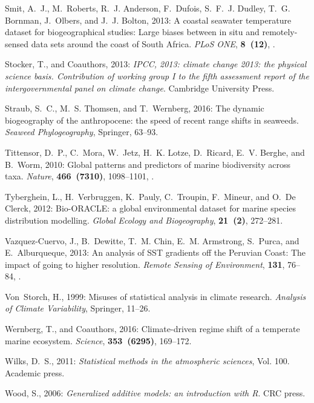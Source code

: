 \documentclass[]{ametsoc}
\begin{document}
\begin{thebibliography}{41}
Smit, A.~J., M.~Roberts, R.~J. Anderson, F.~Dufois, S.~F.~J. Dudley, T.~G.
  Bornman, J.~Olbers, and J.~J. Bolton, 2013: {A coastal seawater temperature
  dataset for biogeographical studies: Large biases between in situ and
  remotely-sensed data sets around the coast of South Africa}. \textit{PLoS
  ONE}, \textbf{8~(12)}, .

Stocker, T., and Coauthors, 2013: \textit{IPCC, 2013: climate change 2013: the
  physical science basis. Contribution of working group I to the fifth
  assessment report of the intergovernmental panel on climate change}.
  Cambridge University Press.

Straub, S.~C., M.~S. Thomsen, and T.~Wernberg, 2016: The dynamic biogeography
  of the anthropocene: the speed of recent range shifts in seaweeds.
  \textit{Seaweed Phylogeography}, Springer, 63--93.

Tittensor, D.~P., C.~Mora, W.~Jetz, H.~K. Lotze, D.~Ricard, E.~V. Berghe, and
  B.~Worm, 2010: {Global patterns and predictors of marine biodiversity across
  taxa.} \textit{Nature}, \textbf{466~(7310)}, 1098--1101,
  .

Tyberghein, L., H.~Verbruggen, K.~Pauly, C.~Troupin, F.~Mineur, and O.~{De
  Clerck}, 2012: {Bio-ORACLE: a global environmental dataset for marine species
  distribution modelling}. \textit{Global Ecology and Biogeography},
  \textbf{21~(2)}, 272--281.

Vazquez-Cuervo, J., B.~Dewitte, T.~M. Chin, E.~M. Armstrong, S.~Purca, and
  E.~Alburqueque, 2013: {An analysis of SST gradients off the Peruvian Coast:
  The impact of going to higher resolution}. \textit{Remote Sensing of
  Environment}, \textbf{131}, 76--84, .

Von~Storch, H., 1999: Misuses of statistical analysis in climate research.
  \textit{Analysis of Climate Variability}, Springer, 11--26.

Wernberg, T., and Coauthors, 2016: {Climate-driven regime shift of a temperate
  marine ecosystem}. \textit{Science}, \textbf{353~(6295)}, 169--172.

Wilks, D.~S., 2011: \textit{Statistical methods in the atmospheric sciences},
  Vol. 100. Academic press.

Wood, S., 2006: \textit{Generalized additive models: an introduction with R}.
  CRC press.

\end{thebibliography}
\end{document}
